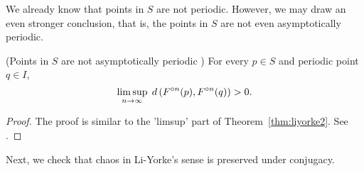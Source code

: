 \documentclass[12pt,draft,twoside]{book}
\begin{document}
We already know that points in $S$ are not periodic.
However, we may draw an even stronger conclusion, that is, the points in $S$ are not even asymptotically periodic.
\begin{theorem}
  (Points in $S$ are not asymptotically periodic \citep{li-yorke})
  For every $p \in S$ and periodic point $q \in I$,
  \begin{equation*}
    \limsup\limits_{n \to \infty}\; d\left( F^{\circ n}(p) , F^{\circ n}(q) \right) > 0.
  \end{equation*}
  \label{thm:liyorke3}
  \begin{proof}
    The proof is similar to the 'limsup' part of Theorem~\ref{thm:liyorke2}.
    See \citet{li-yorke}.
  \end{proof}
\end{theorem}
Next, we check that chaos in Li-Yorke's sense is preserved under conjugacy.
\end{document}
